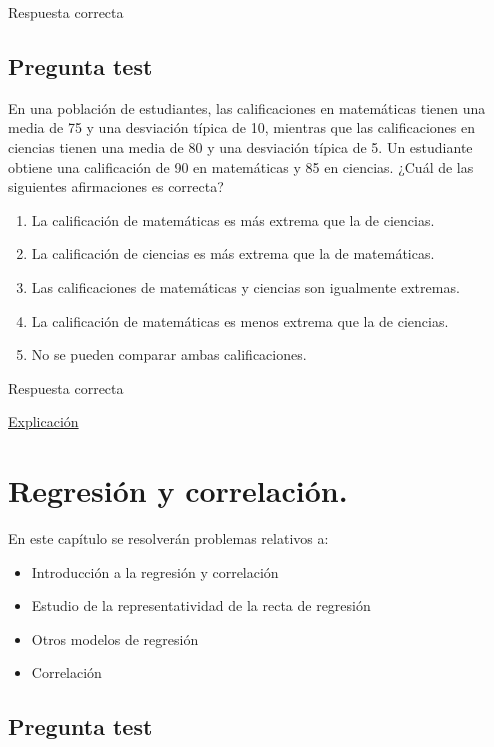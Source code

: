 \documentclass[
]{book}
\providecommand{\tightlist}{%
  \setlength{\itemsep}{0pt}\setlength{\parskip}{0pt}}
\begin{document}
Respuesta correcta

\hypertarget{pregunta-test-121}{%
\section{Pregunta test}\label{pregunta-test-121}}

En una población de estudiantes, las calificaciones en matemáticas tienen una media de 75 y una desviación típica de 10, mientras que las calificaciones en ciencias tienen una media de 80 y una desviación típica de 5. Un estudiante obtiene una calificación de 90 en matemáticas y 85 en ciencias. ¿Cuál de las siguientes afirmaciones es correcta?

\begin{enumerate}
\def\labelenumi{\alph{enumi})}
\tightlist
\item
  La calificación de matemáticas es más extrema que la de ciencias.
\item
  La calificación de ciencias es más extrema que la de matemáticas.
\item
  Las calificaciones de matemáticas y ciencias son igualmente extremas.
\item
  La calificación de matemáticas es menos extrema que la de ciencias.
\item
  No se pueden comparar ambas calificaciones.
\end{enumerate}

Respuesta correcta

\href{https://homepage.divms.uiowa.edu/~mbognar/applets/normal.html}{Explicación}

\hypertarget{regresiuxf3n-y-correlaciuxf3n.}{%
\chapter{Regresión y correlación.}\label{regresiuxf3n-y-correlaciuxf3n.}}

En este capítulo se resolverán problemas relativos a:

\begin{itemize}
\tightlist
\item
  Introducción a la regresión y correlación
\item
  Estudio de la representatividad de la recta de regresión
\item
  Otros modelos de regresión
\item
  Correlación
\end{itemize}

\hypertarget{pregunta-test-122}{%
\section{Pregunta test}\label{pregunta-test-122}}
\end{document}
